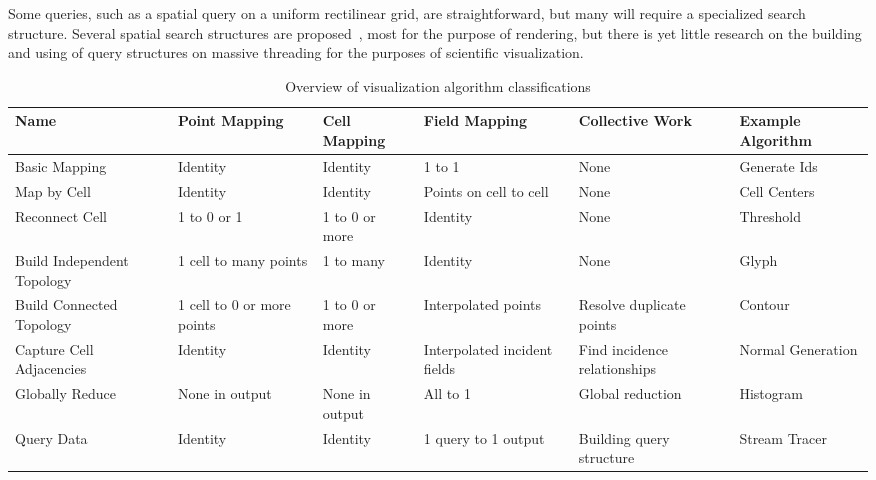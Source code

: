 \documentclass{sig-alternate}
\newcommand*{\lcite}[1]{~\cite{#1}}
\newcommand{\algclass}[1]{\textsf{#1}}
\newcommand{\alg}[1]{#1}
\begin{document}
Some queries, such as a spatial query on a uniform rectilinear grid, are
straightforward, but many will require a specialized search
structure. Several spatial search structures are
proposed\lcite{Foley2005,Kalojanov2009,Kalojanov2011,Zhou2008,Zhou2010},
most for the purpose of rendering, but there is yet little research on the
building and using of query structures on massive threading for the
purposes of scientific visualization.


\begin{table}
  \centering
  \caption{Overview of visualization algorithm classifications}
  \label{table:Classifications}
  \setlength{\defaultaddspace}{0.25\baselineskip}
  \begin{tabulary}{\textwidth}{@{}LLlLLL@{}}
    \toprule
    Name
    & Point Mapping
    & Cell Mapping
    & Field Mapping
    & Collective Work
    & Example Algorithm \\

    \midrule

    \algclass{Basic Mapping}
    & Identity
    & Identity
    & 1 to 1
    & None
    & \alg{Generate Ids} \\ \addlinespace

    \algclass{Map by Cell}
    & Identity
    & Identity
    & Points on cell to cell
    & None
    & \alg{Cell Centers} \\ \addlinespace

    \algclass{Reconnect Cell}
    & 1 to 0 or 1
    & 1 to 0 or more
    & Identity
    & None
    & \alg{Threshold} \\ \addlinespace

    \algclass{Build Independent Topology}
    & 1 cell to many points
    & 1 to many
    & Identity
    & None
    & \alg{Glyph} \\ \addlinespace

    \algclass{Build Connected Topology}
    & 1 cell to 0 or more points
    & 1 to 0 or more
    & Interpolated points
    & Resolve duplicate points
    & \alg{Contour} \\ \addlinespace

    \algclass{Capture Cell Adjacencies}
    & Identity
    & Identity
    & Interpolated incident fields
    & Find incidence relationships
    & \alg{Normal Generation} \\ \addlinespace

    \algclass{Globally Reduce}
    & None in output
    & None in output
    & All to 1
    & Global reduction
    & \alg{Histogram} \\ \addlinespace

    \algclass{Query Data}
    & Identity
    & Identity
    & 1 query to 1 output
    & Building query structure
    & \alg{Stream Tracer} \\

    \bottomrule
  \end{tabulary}
\end{table}
\end{document}
